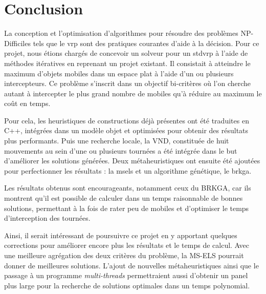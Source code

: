 \chapter*{Conclusion}

La conception et l'optimisation d'algorithmes pour résoudre des problèmes NP-Difficiles tels que le \acrlong{vrp} sont des pratiques courantes d'aide à la décision. Pour ce projet, nous étions chargés de concevoir un solveur pour un \acrlong{stdvrp} à l'aide de méthodes itératives en reprenant un projet existant. Il consistait à atteindre le maximum d'objets mobiles dans un espace plat à l'aide d'un ou plusieurs intercepteurs. Ce problème s'inscrit dans un objectif bi-critères où l'on cherche autant à intercepter le plus grand nombre de mobiles qu'à réduire au maximum le coût en temps.

Pour cela, les heuristiques de constructions déjà présentes ont été traduites en C++, intégrées dans un modèle objet et optimisées pour obtenir des résultats plus performants. Puis une recherche locale, la VND, constituée de huit mouvements au sein d'une ou plusieurs tournées a été intégrée dans le but d'améliorer les solutions générées. Deux métaheuristiques ont ensuite été ajoutées pour perfectionner les résultats : la \acrlong{msels} et un algorithme génétique, le \acrlong{brkga}.

Les résultats obtenus sont encourageants, notamment ceux du BRKGA, car ils montrent qu'il est possible de calculer dans un temps raisonnable de bonnes solutions, permettant à la fois de rater peu de mobiles et d'optimiser le temps d'interception des tournées.

Ainsi, il serait intéressant de poursuivre ce projet en y apportant quelques corrections pour améliorer encore plus les résultats et le temps de calcul. Avec une meilleure agrégation des deux critères du problème, la MS-ELS pourrait donner de meilleures solutions. L'ajout de nouvelles métaheuristiques ainsi que le passage à un programme \emph{multi-threads} permettraient aussi d'obtenir un panel plus large pour la recherche de solutions optimales dans un temps polynomial.

